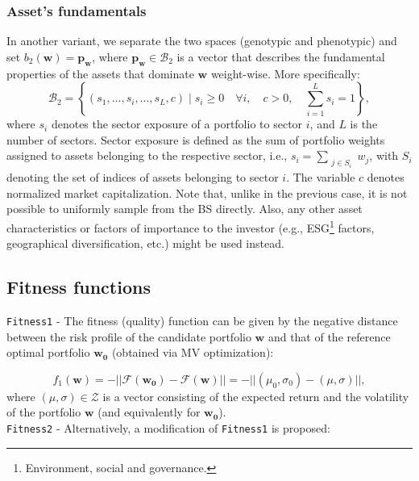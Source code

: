 \subsubsection{Asset's fundamentals} In another variant, we separate the two spaces (genotypic and phenotypic) and set $b_2(\boldsymbol{w})=\boldsymbol{p}_{\boldsymbol{w}}$, where $\boldsymbol{p}_{\boldsymbol{w}} \in \mathcal{B}_2$ is a vector that describes the fundamental properties of the assets that dominate $\boldsymbol{w}$ weight-wise. More specifically:
\begin{equation}
    \mathcal{B}_2 = \left\{ (s_1, \ldots, s_i, \ldots, s_L, c) \mid s_i \geq 0 \quad \forall i, \quad c > 0, \quad \sum_{i=1}^{L} s_i = 1 \right\},
\label{eq1.5}
\end{equation}
where $s_i$ denotes the sector exposure of a portfolio to sector $i$, and $L$ is the number of sectors. Sector exposure is defined as the sum of portfolio weights assigned to assets belonging to the respective sector, i.e., $s_i = \sum_{\substack{j \in S_i}} w_j$, with $S_i$ denoting the set of indices of assets belonging to sector $i$. The variable $c$ denotes normalized market capitalization. Note that, unlike in the previous case, it is not possible to uniformly sample from the BS directly. Also, any other asset characteristics or factors of importance to the investor (e.g., ESG\footnote{Environment, social and governance.} factors, geographical diversification, etc.) might be used instead.

\subsection{Fitness functions}

\verb|Fitness1| - The fitness (quality) function can be given by the negative distance between the risk profile of the candidate portfolio $\boldsymbol{w}$ and that of the reference optimal portfolio $\boldsymbol{w_0}$ (obtained via MV optimization):

\begin{equation}
    f_1(\boldsymbol{w}) = - ||\mathcal{F}(\boldsymbol{w_0})-\mathcal{F}(\boldsymbol{w})|| = -||(\mu_0, \sigma_0)-(\mu, \sigma)||,
\end{equation}
where $(\mu, \sigma) \in \mathcal{Z}$ is a vector consisting of the expected return and the volatility of the portfolio $\boldsymbol{w}$ (and equivalently for $\boldsymbol{w_0}$). \\
\noindent
\verb|Fitness2| - Alternatively, a modification of \verb|Fitness1| is proposed:

